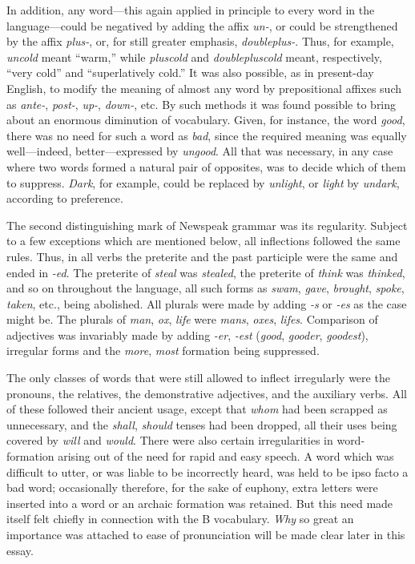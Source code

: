 In addition, any word---this again applied in principle to every word in
the language---could be negatived by adding the affix \emph{un-}, or
could be strengthened by the affix \emph{plus-}, or, for still greater
emphasis, \emph{doubleplus-}. Thus, for example, \emph{uncold} meant
``warm,'' while \emph{pluscold} and \emph{doublepluscold} meant,
respectively, ``very cold'' and ``superlatively cold.'' It was also
possible, as in present-day English, to modify the meaning of almost any
word by prepositional affixes such as \emph{ante-}, \emph{post-},
\emph{up-}, \emph{down-}, etc. By such methods it was found possible to
bring about an enormous diminution of vocabulary. Given, for instance,
the word \emph{good}, there was no need for such a word as \emph{bad},
since the required meaning was equally well---indeed, better---expressed
by \emph{ungood}. All that was necessary, in any case where two words
formed a natural pair of opposites, was to decide which of them to
suppress. \emph{Dark}, for example, could be replaced by \emph{unlight},
or \emph{light} by \emph{undark}, according to preference.

The second distinguishing mark of Newspeak grammar was its regularity.
Subject to a few exceptions which are mentioned below, all inflections
followed the same rules. Thus, in all verbs the preterite and the past
participle were the same and ended in \emph{-ed}. The preterite of
\emph{steal} was \emph{stealed}, the preterite of \emph{think} was
\emph{thinked}, and so on throughout the language, all such forms as
\emph{swam}, \emph{gave}, \emph{brought}, \emph{spoke}, \emph{taken},
etc., being abolished. All plurals were made by adding \emph{-s} or
\emph{-es} as the case might be. The plurals of \emph{man}, \emph{ox},
\emph{life} were \emph{mans}, \emph{oxes}, \emph{lifes}. Comparison of
adjectives was invariably made by adding \emph{-er}, \emph{-est}
(\emph{good}, \emph{gooder}, \emph{goodest}), irregular forms and the
\emph{more}, \emph{most} formation being suppressed.

The only classes of words that were still allowed to inflect irregularly
were the pronouns, the relatives, the demonstrative adjectives, and the
auxiliary verbs. All of these followed their ancient usage, except that
\emph{whom} had been scrapped as unnecessary, and the \emph{shall},
\emph{should} tenses had been dropped, all their uses being covered by
\emph{will} and \emph{would}. There were also certain irregularities in
word-formation arising out of the need for rapid and easy speech. A word
which was difficult to utter, or was liable to be incorrectly heard, was
held to be ipso facto a bad word; occasionally therefore, for the sake
of euphony, extra letters were inserted into a word or an archaic
formation was retained. But this need made itself felt chiefly in
connection with the B vocabulary. \emph{Why} so great an importance was
attached to ease of pronunciation will be made clear later in this
essay.

